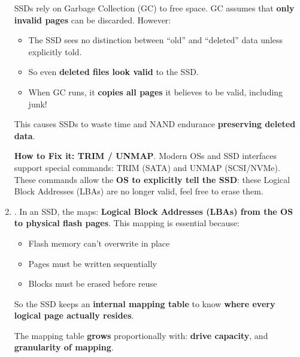 \begin{enumerate}
    SSDs rely on Garbage Collection (GC) to free space. GC assumes that \textbf{only invalid pages} can be discarded. However:
    \begin{itemize}
        \item The SSD sees no distinction between ``old'' and ``deleted'' data unless explicitly told.
        \item So even \textbf{deleted files look valid} to the SSD.
        \item When GC runs, it \textbf{copies all pages} it believes to be valid, including junk!
    \end{itemize}
    This causes SSDs to waste time and NAND endurance \textbf{preserving deleted data}.

    \textcolor{Green3}{ \textbf{How to Fix it: TRIM / UNMAP}}. Modern OSs and SSD interfaces support special commands: TRIM (SATA) and UNMAP (SCSI/NVMe). These commands allow the \textbf{OS to explicitly tell the SSD}: these Logical Block Addresses (LBAs) are no longer valid, feel free to erase them.


    \item {}. In an SSD, the  maps: \textbf{Logical Block Addresses (LBAs) from the OS to physical flash pages}. This mapping is essential because:
    \begin{itemize}
        \item Flash memory can't overwrite in place
        \item Pages must be written sequentially
        \item Blocks must be erased before reuse
    \end{itemize}
    So the SSD keeps an \textbf{internal mapping table} to know \textbf{where every logical page actually resides}.

    The mapping table \textbf{grows} proportionally with: \textbf{drive capacity}, and \textbf{granularity of mapping}.


\end{enumerate}
